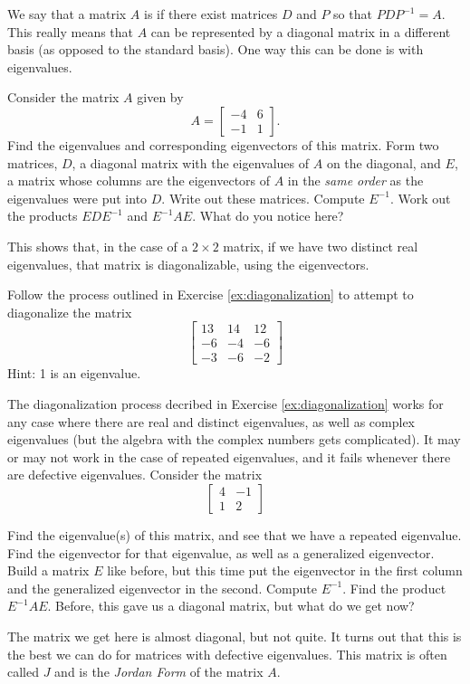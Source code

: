 \begin{exercise} \label{ex:diagonalization}
We say that a matrix $A$ is \emph{} if there exist matrices $D$ and $P$ so that $PDP^{-1} = A$. This really means that $A$ can be represented by a diagonal matrix in a different basis (as opposed to the standard basis). One way this can be done is with eigenvalues.
\begin{tasks}
\task Consider the matrix $A$ given by 
\[ A = \begin{bmatrix} -4 & 6 \\ -1 & 1 \end{bmatrix}. \]
Find the eigenvalues and corresponding eigenvectors of this matrix.
\task Form two matrices, $D$, a diagonal matrix with the eigenvalues of $A$ on the diagonal, and $E$, a matrix whose columns are the eigenvectors of $A$ in the \emph{same order} as the eigenvalues were put into $D$. Write out these matrices.
\task Compute $E^{-1}$. 
\task Work out the products $EDE^{-1}$ and $E^{-1}AE$. What do you notice here?
\end{tasks}
This shows that, in the case of a $2\times 2$ matrix, if we have two distinct real eigenvalues, that matrix is diagonalizable, using the eigenvectors.
\end{exercise}

\begin{exercise}
Follow the process outlined in Exercise \ref{ex:diagonalization} to attempt to diagonalize the matrix
\[ \begin{bmatrix} 13 & 14 & 12 \\ -6 & -4 & -6 \\ -3 & -6 & -2 \end{bmatrix}\] Hint: 1 is an eigenvalue. 
\end{exercise}

\begin{exercise} \label{ex:jordanform}
The diagonalization process decribed in Exercise \ref{ex:diagonalization} works for any case where there are real and distinct eigenvalues, as well as complex eigenvalues (but the algebra with the complex numbers gets complicated). It may or may not work in the case of repeated eigenvalues, and it fails whenever there are defective eigenvalues. Consider the matrix
\[ \begin{bmatrix} 4 & -1 \\ 1 & 2 \end{bmatrix} \]
\begin{tasks}
\task Find the eigenvalue(s) of this matrix, and see that we have a repeated eigenvalue. 
\task Find the eigenvector for that eigenvalue, as well as a generalized eigenvector.
\task Build a matrix $E$ like before, but this time put the eigenvector in the first column and the generalized eigenvector in the second. Compute $E^{-1}$. 
\task Find the product $E^{-1}AE$. Before, this gave us a diagonal matrix, but what do we get now? 
\end{tasks}
The matrix we get here is almost diagonal, but not quite. It turns out that this is the best we can do for matrices with defective eigenvalues. This matrix is often called $J$ and is the \emph{Jordan Form} of the matrix $A$. 
\end{exercise}


